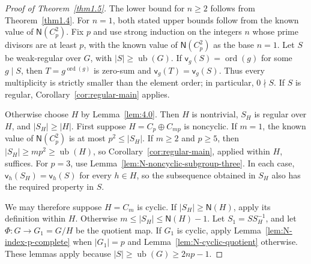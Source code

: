 \documentclass[10pt,reqno]{amsart}
\theoremstyle{definition}
\theoremstyle{remark}
\numberwithin{equation}{section}
\DeclareMathOperator{\ord}{ord}
\begin{document}
\begin{proof}[Proof of Theorem~\ref{thm1.5}]
The lower bound for $n\ge2$ follows from Theorem~\ref{thm1.4}.
For $n=1$, both stated upper bounds follow from the known value of
$\mathsf N(C_p^2)$.
Fix $p$ and use strong induction on the integers $n$ whose prime divisors are at least $p$,
with the known value of $\mathsf N(C_p^2)$ as the base $n=1$.
Let $S$ be weak-regular over $G$, with $|S|\ge \operatorname{ub}(G)$.
If $\mathsf v_g(S)=\ord(g)$ for some $g\mid S$, then
$T=g^{\ord(g)}$ is zero-sum and $\mathsf v_g(T)=\mathsf v_g(S)$.
Thus every multiplicity is strictly smaller than the element order;
in particular, $0\nmid S$.
If $S$ is regular, Corollary~\ref{cor:regular-main} applies.

Otherwise choose $H$ by Lemma~\ref{lem:4.0}.
Then $H$ is nontrivial, $S_H$ is regular over $H$, and $|S_H|\ge|H|$.
First suppose $H=C_p\oplus C_{mp}$ is noncyclic.
If $m=1$, the known value of $\mathsf N(C_p^2)$ is at most $p^2\le|S_H|$.
If $m\ge2$ and $p\ge5$, then $|S_H|\ge mp^2\ge \operatorname{ub}(H)$,
so Corollary~\ref{cor:regular-main}, applied within $H$, suffices.
For $p=3$, use Lemma~\ref{lem:N-noncyclic-subgroup-three}.
In each case, $\mathsf v_h(S_H)=\mathsf v_h(S)$ for every $h\in H$,
so the subsequence obtained in $S_H$ also has the required property in $S$.

We may therefore suppose $H=C_m$ is cyclic.
If $|S_H|\ge\mathsf N(H)$, apply its definition within $H$.
Otherwise $m\le|S_H|\le\mathsf N(H)-1$.
Let $S_1=SS_H^{-1}$, and let $\Phi:G\to G_1=G/H$ be the quotient map.
If $G_1$ is cyclic, apply Lemma~\ref{lem:N-index-p-complete} when $|G_1|=p$
and Lemma~\ref{lem:N-cyclic-quotient} otherwise.
These lemmas apply because $|S|\ge \operatorname{ub}(G)\ge2np-1$.


\end{proof}
\end{document}
